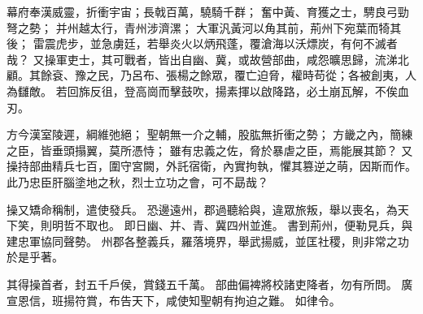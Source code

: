 幕府奉漢威靈，折衝宇宙；長戟百萬，驍騎千群；
奮中黃、育獲之士，騁良弓勁弩之勢；
并州越太行，青州涉濟漯；
大軍汎黃河以角其前，荊州下宛葉而犄其後；
雷震虎步，並急虜廷，若舉炎火以炳飛蓬，覆滄海以沃熛炭，有何不滅者哉？
又操軍吏士，其可戰者，皆出自幽、冀，或故營部曲，咸怨曠思歸，流涕北顧。其餘袞、豫之民，乃呂布、張楊之餘眾，覆亡迫脅，權時苟從；各被創夷，人為讎敵。
若回旆反徂，登高崗而擊鼓吹，揚素揮以啟降路，必土崩瓦解，不俟血刃。

方今漢室陵遲，綱維弛絕；
聖朝無一介之輔，股肱無折衝之勢；
方畿之內，簡練之臣，皆垂頭搨翼，莫所憑恃；
雖有忠義之佐，脅於暴虐之臣，焉能展其節？
又操持部曲精兵七百，圍守宮闕，外託宿衛，內實拘執，懼其篡逆之萌，因斯而作。
此乃忠臣肝腦塗地之秋，烈士立功之會，可不勗哉？

操又矯命稱制，遣使發兵。
恐邊遠州，郡過聽給與，違眾旅叛，舉以喪名，為天下笑，則明哲不取也。
即日幽、并、青、冀四州並進。
書到荊州，便勒見兵，與建忠軍協同聲勢。
州郡各整義兵，羅落境界，舉武揚威，並匡社稷，則非常之功於是乎著。

其得操首者，封五千戶侯，賞錢五千萬。
部曲偏裨將校諸吏降者，勿有所問。
廣宣恩信，班揚符賞，布告天下，咸使知聖朝有拘迫之難。
如律令。